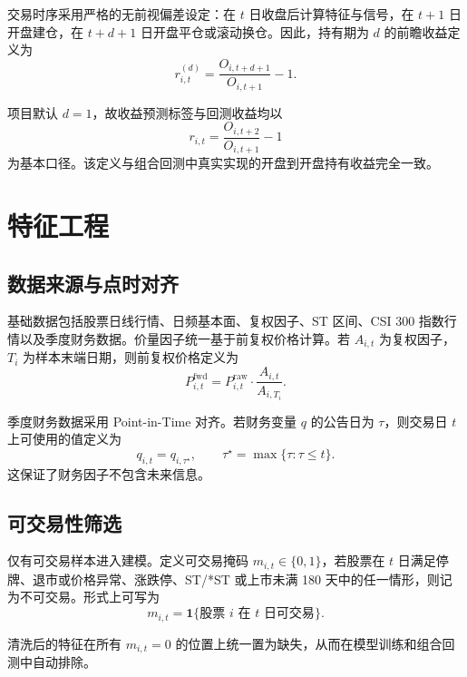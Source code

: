 \documentclass[12pt, a4paper, oneside]{article}
\begin{document}
交易时序采用严格的无前视偏差设定：在 \(t\) 日收盘后计算特征与信号，在 \(t+1\) 日开盘建仓，在 \(t+d+1\) 日开盘平仓或滚动换仓。因此，持有期为 \(d\) 的前瞻收益定义为
\begin{equation}
r_{i,t}^{(d)} = \frac{O_{i,t+d+1}}{O_{i,t+1}} - 1.
\end{equation}

项目默认 \(d=1\)，故收益预测标签与回测收益均以
\begin{equation}
r_{i,t} = \frac{O_{i,t+2}}{O_{i,t+1}} - 1
\end{equation}
为基本口径。该定义与组合回测中真实实现的开盘到开盘持有收益完全一致。

\section{特征工程}

\subsection{数据来源与点时对齐}

基础数据包括股票日线行情、日频基本面、复权因子、ST 区间、CSI 300 指数行情以及季度财务数据。价量因子统一基于前复权价格计算。若 \(A_{i,t}\) 为复权因子，\(T_i\) 为样本末端日期，则前复权价格定义为
\begin{equation}
P_{i,t}^{\mathrm{fwd}} = P_{i,t}^{\mathrm{raw}} \cdot \frac{A_{i,t}}{A_{i,T_i}}.
\end{equation}

季度财务数据采用 Point-in-Time 对齐。若财务变量 \(q\) 的公告日为 \(\tau\)，则交易日 \(t\) 上可使用的值定义为
\begin{equation}
q_{i,t} = q_{i,\tau^\star}, \qquad \tau^\star = \max\{\tau : \tau \le t\}.
\end{equation}
这保证了财务因子不包含未来信息。

\subsection{可交易性筛选}

仅有可交易样本进入建模。定义可交易掩码 \(m_{i,t} \in \{0,1\}\)，若股票在 \(t\) 日满足停牌、退市或价格异常、涨跌停、ST/*ST 或上市未满 180 天中的任一情形，则记为不可交易。形式上可写为
\begin{equation}
m_{i,t} = \mathbf 1\{\text{股票 } i \text{ 在 } t \text{ 日可交易}\}.
\end{equation}

清洗后的特征在所有 \(m_{i,t}=0\) 的位置上统一置为缺失，从而在模型训练和组合回测中自动排除。
\end{document}
